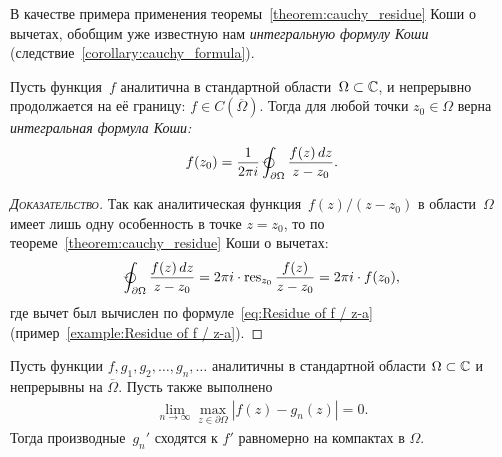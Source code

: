 \documentclass[../complex-analysis.tex]{subfiles}
\begin{document}
В качестве примера применения теоремы~\ref{theorem:cauchy_residue} Коши о вычетах, обобщим уже известную нам \emph{интегральную формулу Коши} (следствие~\ref{corollary:cauchy_formula}).

\begin{crly}
 \label{corollary:Cauchy Integral Formula}
 Пусть функция~$ f $ аналитична в стандартной области~$ \Omega \subset \mathbb{C} $, и непрерывно продолжается на её границу: $ f \in C(\overline \Omega) $. Тогда для любой точки $ z_0 \in \Omega $ верна \emph{интегральная формула Коши:}
 \begin{align}
  \label{eq:Cauchy Integral Formula}
  f(z_0) = \frac{1}{2\pi i} \varointctrclockwise_{\partial\Omega} \frac{f(z)\,dz}{z-z_0}.
 \end{align}
\end{crly}
\begin{proof}[\normalfont\textsc{Доказательство}]
 Так как аналитическая функция~$ f(z) / (z-z_0) $ в области~$ \Omega $ имеет лишь одну особенность в точке $ z = z_0 $, то по теореме~\ref{theorem:cauchy_residue} Коши о вычетах:
 \begin{align*}
  \varointctrclockwise_{\partial \Omega} \frac{f(z)\,dz}{z-z_0} = 2\pi i \cdot \residue_{z_0} \frac{f(z)}{z-z_0} = 2\pi i  \cdot f(z_0),
 \end{align*} где вычет был вычислен по формуле~\eqref{eq:Residue of f / z-a} (пример~\ref{example:Residue of f / z-a}).
\end{proof}

\begin{thm}
 \label{theorem:Derivative Convergence Example}
 Пусть функции $ f, g_1, g_2, \ldots, g_n, \ldots $ аналитичны в стандартной области $ \Omega \subset \mathbb{C} $ и непрерывны на $ \overline \Omega $. Пусть также выполнено
 \begin{align}
  \label{eq:Condition:Derivative Convergence Example}
  \lim_{n \to \infty} \max_{z \in \partial\Omega} \left| f(z)-g_n(z) \right| = 0.
 \end{align} Тогда производные~$ g_n' $ сходятся к $ f' $ равномерно на компактах в $ \Omega $.
\end{thm}
\end{document}
